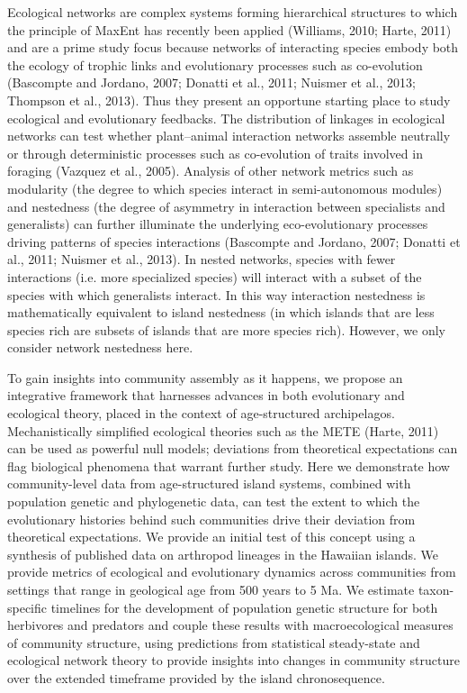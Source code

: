 Ecological networks are complex systems forming hierarchical
structures to which the principle of MaxEnt has recently been applied
(Williams, 2010; Harte, 2011) and are a prime study focus because
networks of interacting species embody both the ecology of trophic
links and evolutionary processes such as co-evolution (Bascompte and
Jordano, 2007; Donatti et al., 2011; Nuismer et al., 2013; Thompson et
al., 2013). Thus they present an opportune starting place to study
ecological and evolutionary feedbacks. The distribution of linkages in
ecological networks can test whether plant–animal interaction networks
assemble neutrally or through deterministic processes such as
co-evolution of traits involved in foraging (Vazquez et al.,
2005). Analysis of other network metrics such as modularity (the
degree to which species interact in semi-autonomous modules) and
nestedness (the degree of asymmetry in interaction between specialists
and generalists) can further illuminate the underlying
eco-evolutionary processes driving patterns of species interactions
(Bascompte and Jordano, 2007; Donatti et al., 2011; Nuismer et al.,
2013). In nested networks, species with fewer interactions (i.e. more
specialized species) will interact with a subset of the species with
which generalists interact. In this way interaction nestedness is
mathematically equivalent to island nestedness (in which islands that
are less species rich are subsets of islands that are more species
rich). However, we only consider network nestedness here.

To gain insights into community assembly as it happens, we propose an
integrative framework that harnesses advances in both evolutionary and
ecological theory, placed in the context of age-structured
archipelagos. Mechanistically simplified ecological theories such as
the METE (Harte, 2011) can be used as powerful null models; deviations
from theoretical expectations can flag biological phenomena that
warrant further study. Here we demonstrate how community-level data
from age-structured island systems, combined with population genetic
and phylogenetic data, can test the extent to which the evolutionary
histories behind such communities drive their deviation from
theoretical expectations. We provide an initial test of this concept
using a synthesis of published data on arthropod lineages in the
Hawaiian islands. We provide metrics of ecological and evolutionary
dynamics across communities from settings that range in geological age
from 500 years to 5 Ma. We estimate taxon-specific timelines for the
development of population genetic structure for both herbivores and
predators and couple these results with macroecological measures of
community structure, using predictions from statistical steady-state
and ecological network theory to provide insights into changes in
community structure over the extended timeframe provided by the island
chronosequence.


